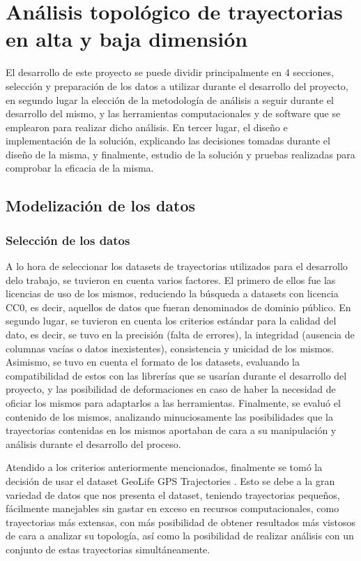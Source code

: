 \chapter{Análisis topológico de trayectorias en alta y baja dimensión} \label{chp:desarrollo}

El desarrollo de este proyecto se puede dividir principalmente en 4 secciones, selección y preparación de los datos a utilizar durante el desarrollo del proyecto, en segundo lugar la elección de la metodología de análisis a seguir durante el desarrollo del mismo, y las herramientas computacionales y de software que se emplearon para realizar dicho análisis. En tercer lugar, el diseño e implementación de la solución, explicando las decisiones tomadas durante el diseño de la misma, y finalmente, estudio de la solución y pruebas realizadas para comprobar la eficacia de la misma.

\section{Modelización de los datos}

\subsection{Selección de los datos}
A lo hora de seleccionar los datasets de trayectorias utilizados para el desarrollo delo trabajo, se tuvieron en cuenta varios factores. El primero de ellos fue las licencias de uso de los mismos, reduciendo la búsqueda a datasets con licencia CC0, es decir, aquellos de datos que fueran denominados de dominio público. En segundo lugar, se tuvieron en cuenta los criterios estándar para la calidad del dato, es decir, se tuvo en la precisión (falta de errores), la integridad (ausencia de columnas vacías o datos inexistentes), consistencia y unicidad de los mismos. Asimismo, se tuvo en cuenta el formato de los datasets, evaluando la compatibilidad de estos con las librerías que se usarían durante el desarrollo del proyecto, y las posibilidad de deformaciones en caso de haber la necesidad de oficiar los mismos para adaptarlos a las herramientas. Finalmente, se evaluó el contenido de los mismos, analizando minuciosamente las posibilidades que la trayectorias contenidas en los mismos aportaban de cara a su manipulación y análisis durante el desarrollo del proceso.


Atendido a los criterios anteriormente mencionados, finalmente se tomó la decisión de usar el dataset GeoLife GPS Trajectories \cite{geolife_datos} . Esto se debe a la gran variedad de datos que nos presenta el dataset, teniendo trayectorias pequeños, fácilmente manejables sin gastar en exceso en recursos computacionales, como trayectorias más extensas, con más posibilidad de obtener resultados más vistosos de cara a analizar su topología, así como la posibilidad de realizar análisis con un conjunto de estas trayectorias simultáneamente. 

